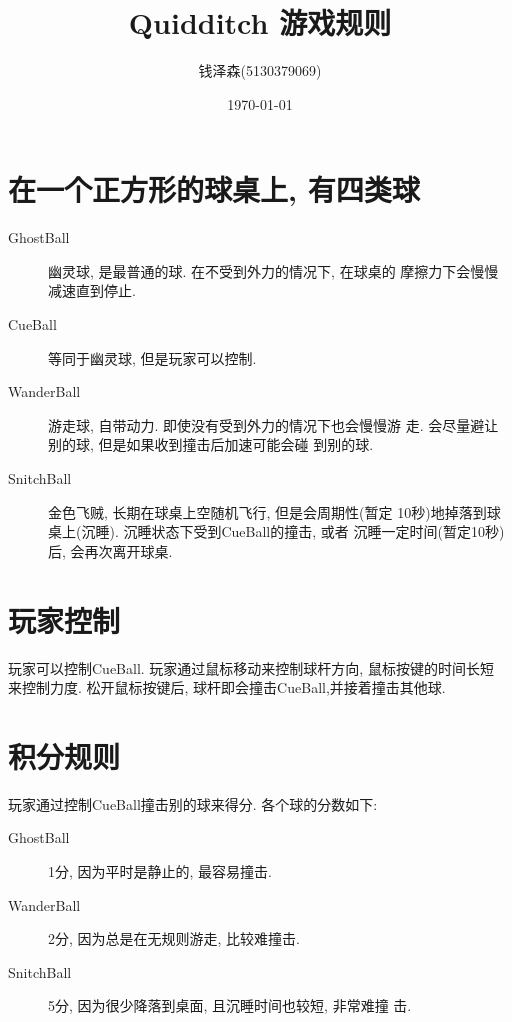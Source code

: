\documentclass[11pt]{article}
\author{钱泽森(5130379069)}
\date{\today}
\title{Quidditch 游戏规则}
\begin{document}
\maketitle

\section*{在一个正方形的球桌上, 有四类球}
\label{sec-1}
\begin{description}
\item[{GhostBall}] 幽灵球, 是最普通的球. 在不受到外力的情况下, 在球桌的
摩擦力下会慢慢减速直到停止.
\item[{CueBall}] 等同于幽灵球, 但是玩家可以控制.
\item[{WanderBall}] 游走球, 自带动力. 即使没有受到外力的情况下也会慢慢游
走. 会尽量避让别的球, 但是如果收到撞击后加速可能会碰
到别的球.
\item[{SnitchBall}] 金色飞贼, 长期在球桌上空随机飞行, 但是会周期性(暂定
10秒)地掉落到球桌上(沉睡). 沉睡状态下受到CueBall的撞击, 或者
沉睡一定时间(暂定10秒)后, 会再次离开球桌.
\end{description}
\section*{玩家控制}
\label{sec-2}
玩家可以控制CueBall. 玩家通过鼠标移动来控制球杆方向, 鼠标按键的时间长短
来控制力度. 松开鼠标按键后, 球杆即会撞击CueBall,并接着撞击其他球.
\section*{积分规则}
\label{sec-3}
玩家通过控制CueBall撞击别的球来得分. 各个球的分数如下:
\begin{description}
\item[{GhostBall}] 1分, 因为平时是静止的, 最容易撞击.
\item[{WanderBall}] 2分, 因为总是在无规则游走, 比较难撞击.
\item[{SnitchBall}] 5分, 因为很少降落到桌面, 且沉睡时间也较短, 非常难撞
击.
\end{description}
\end{document}
